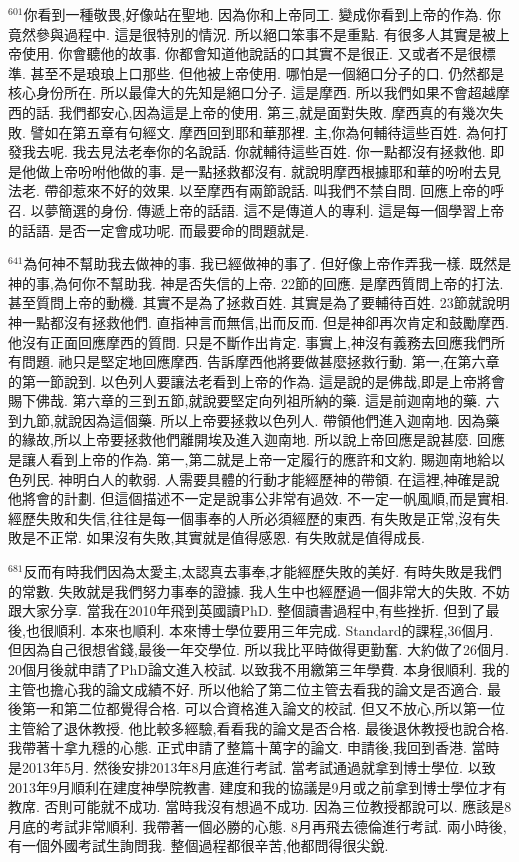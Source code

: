 \documentclass{book}
\begin{document}
$^{601}$你看到一種敬畏,好像站在聖地.
因為你和上帝同工.
變成你看到上帝的作為.
你竟然參與過程中.
這是很特別的情況.
所以絕口笨事不是重點.
有很多人其實是被上帝使用.
你會聽他的故事.
你都會知道他說話的口其實不是很正.
又或者不是很標準.
甚至不是琅琅上口那些.
但他被上帝使用.
哪怕是一個絕口分子的口.
仍然都是核心身份所在.
所以最偉大的先知是絕口分子.
這是摩西.
所以我們如果不會超越摩西的話.
我們都安心,因為這是上帝的使用.
第三,就是面對失敗.
摩西真的有幾次失敗.
譬如在第五章有句經文.
摩西回到耶和華那裡.
主,你為何輔待這些百姓.
為何打發我去呢.
我去見法老奉你的名說話.
你就輔待這些百姓.
你一點都沒有拯救他.
即是他做上帝吩咐他做的事.
是一點拯救都沒有.
就說明摩西根據耶和華的吩咐去見法老.
帶卻惹來不好的效果.
以至摩西有兩節說話.
叫我們不禁自問.
回應上帝的呼召.
以夢簡選的身份.
傳遞上帝的話語.
這不是傳道人的專利.
這是每一個學習上帝的話語.
是否一定會成功呢.
而最要命的問題就是.

$^{641}$為何神不幫助我去做神的事.
我已經做神的事了.
但好像上帝作弄我一樣.
既然是神的事,為何你不幫助我.
神是否失信的上帝.
22節的回應.
是摩西質問上帝的打法.
甚至質問上帝的動機.
其實不是為了拯救百姓.
其實是為了要輔待百姓.
23節就說明神一點都沒有拯救他們.
直指神言而無信,出而反而.
但是神卻再次肯定和鼓勵摩西.
他沒有正面回應摩西的質問.
只是不斷作出肯定.
事實上,神沒有義務去回應我們所有問題.
祂只是堅定地回應摩西.
告訴摩西他將要做甚麼拯救行動.
第一,在第六章的第一節說到.
以色列人要讓法老看到上帝的作為.
這是說的是佛哉,即是上帝將會賜下佛哉.
第六章的三到五節,就說要堅定向列祖所納的藥.
這是前迦南地的藥.
六到九節,就說因為這個藥.
所以上帝要拯救以色列人.
帶領他們進入迦南地.
因為藥的緣故,所以上帝要拯救他們離開埃及進入迦南地.
所以說上帝回應是說甚麼.
回應是讓人看到上帝的作為.
第一,第二就是上帝一定履行的應許和文約.
賜迦南地給以色列民.
神明白人的軟弱.
人需要具體的行動才能經歷神的帶領.
在這裡,神確是說他將會的計劃.
但這個描述不一定是說事公非常有過效.
不一定一帆風順,而是實相.
經歷失敗和失信,往往是每一個事奉的人所必須經歷的東西.
有失敗是正常,沒有失敗是不正常.
如果沒有失敗,其實就是值得感恩.
有失敗就是值得成長.

$^{681}$反而有時我們因為太愛主,太認真去事奉,才能經歷失敗的美好.
有時失敗是我們的常數.
失敗就是我們努力事奉的證據.
我人生中也經歷過一個非常大的失敗.
不妨跟大家分享.
當我在2010年飛到英國讀PhD.
整個讀書過程中,有些挫折.
但到了最後,也很順利.
本來也順利.
本來博士學位要用三年完成.
Standard的課程,36個月.
但因為自己很想省錢,最後一年交學位.
所以我比平時做得更勤奮.
大約做了26個月.
20個月後就申請了PhD論文進入校試.
以致我不用繳第三年學費.
本身很順利.
我的主管也擔心我的論文成績不好.
所以他給了第二位主管去看我的論文是否適合.
最後第一和第二位都覺得合格.
可以合資格進入論文的校試.
但又不放心,所以第一位主管給了退休教授.
他比較多經驗,看看我的論文是否合格.
最後退休教授也說合格.
我帶著十拿九穩的心態.
正式申請了整篇十萬字的論文.
申請後,我回到香港.
當時是2013年5月.
然後安排2013年8月底進行考試.
當考試通過就拿到博士學位.
以致2013年9月順利在建度神學院教書.
建度和我的協議是9月或之前拿到博士學位才有教席.
否則可能就不成功.
當時我沒有想過不成功.
因為三位教授都說可以.
應該是8月底的考試非常順利.
我帶著一個必勝的心態.
8月再飛去德倫進行考試.
兩小時後,有一個外國考試生詢問我.
整個過程都很辛苦,他都問得很尖銳.
\end{document}
